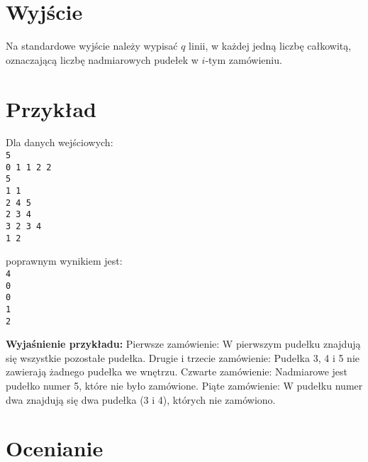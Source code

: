 \documentclass[10pt]{article}
\begin{document}

    \section*{Wyjście}
    
    Na standardowe wyjście należy wypisać $q$ linii, w każdej jedną liczbę całkowitą, oznaczającą liczbę nadmiarowych pudełek w $i$-tym zamówieniu.


    \section*{Przykład}
    
    \noindent
    \begin{minipage}[t]{0.5\textwidth}
        Dla danych wejściowych:\vspace{1ex}\\
        \texttt{5\\0 1 1 2 2\\5\\1 1\\2 4 5\\2 3 4\\3 2 3 4\\1 2}
    \end{minipage}
    \begin{minipage}[t]{0.5\textwidth}
        poprawnym wynikiem jest:\vspace{1ex}\\
        \texttt{4\\0\\0\\1\\2}
    \end{minipage}
    
    \vspace{2ex}
    \noindent\textbf{Wyjaśnienie przykładu:} Pierwsze zamówienie: W pierwszym pudełku znajdują się wszystkie pozostałe pudełka. Drugie i trzecie zamówienie: Pudełka 3, 4 i 5 nie zawierają żadnego pudełka we wnętrzu. Czwarte zamówienie: Nadmiarowe jest pudełko numer 5, które nie było zamówione. Piąte zamówienie: W pudełku numer dwa znajdują się dwa pudełka (3 i 4), których nie zamówiono.
    

    \section*{Ocenianie}
        
\end{document}
